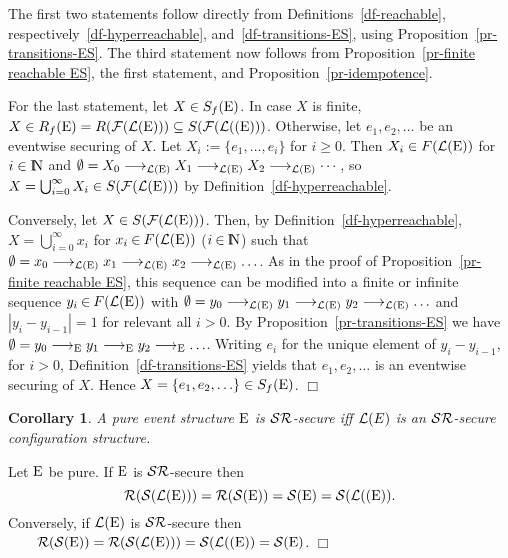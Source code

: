 \documentclass[twocolumn]{article}
\newtheorem{coro}{Corollary}
\newenvironment{corollary}[1]{\begin{coro} \rm \label{cor-#1} }{\end{coro}}
\newenvironment{proof}{\begin{trivlist} \item[\hspace{\labelsep}\bf
Proof:]}{\hfill $\Box$\end{trivlist}}
\newcommand{\df}[1]{Definition~\ref{df-#1}}
\newcommand{\pr}[1]{Proposition~\ref{pr-#1}}
\newcommand{\dl}[1]{\mbox{\rm I\hspace{-0.75mm}#1}}     \newcommand{\dc}[1]{\mbox{\rm {\raisebox{.4ex}{\makebox [0pt][l]{\hspace{.2em}\scriptsize $\mid$}}}#1}}
\newcommand{\IN}{\dl{N}}                        \newcommand{\IQ}{\dc{Q}}                        \newcommand{\IC}{\dc{C}}                        \newcommand{\IE}{\dl{E}}                        \newcommand{\IG}{\dc{G}}                        \newcommand{\fC}{{\cal C}}                      \newcommand{\fE}{{\cal E}}                      \newcommand{\fG}{{\cal G}}                      \newcommand{\fN}{{\cal N}}                      \newcommand{\fF}{{\cal F}}                      \newcommand{\fL}{{\cal L}}                      \newcommand{\fM}{{\cal M}}                      \newcommand{\fS}{{\cal S}}                      \newcommand{\fR}{{\cal R}}                      \newcommand{\eC}{{\rm C}}                       \newcommand{\eD}{{\rm D}}                       \newcommand{\eE}{{\rm E}}                       \newcommand{\eF}{{\rm F}}                       \newcommand{\eG}{{\rm G}}                       \newcommand{\eH}{{\rm H}}                       \newcommand{\eK}{{\rm K}}                       \newcommand{\eL}{{\rm L}}                       \newcommand{\eN}{{\rm N}}                       \newcommand{\eP}{{\rm P}}                       \newcommand{\eM}{{\rm M}}                       \newcommand{\eT}{{\rm T}}                       \newcommand{\fT}{{\cal T}}
\begin{document}
\begin{proof}
The first two statements follow directly from
Definitions~\ref{df-reachable}, respectively~\ref{df-hyperreachable},
and~\ref{df-transitions-ES}, using \pr{transitions-ES}. The third
statement now follows from \pr{finite reachable ES}, the first
statement, and \pr{idempotence}.

For the last statement, let $X\in S_f(\eE)$. In case $X$ is finite, $X
\in R_f(\eE) = R(\fF(\fL(\eE))) \subseteq S(\fF(\fL((\eE)))$. Otherwise,
let $e_1,e_2,\ldots$ be an eventwise securing of $X$. Let $X_i \mathbin{:=}
\{e_1,\ldots,e_i\}$ for $i\mathbin\geq 0$.  Then $X_i \in F(\fL(\eE))$
for $i\in\IN$ and $\emptyset =X_0 \goto{}_{\fL(\eE)} X_1
\goto{}_{\fL(\eE)} X_2 \goto{}_{\fL(\eE)} \cdots$, so
$X = \bigcup_{i=0}^\infty X_i \in S(\fF(\fL(\eE)))$ by \df{hyperreachable}.

Conversely, let $X\in S(\fF(\fL(\eE)))$. Then, by \df{hyperreachable},
$X=\bigcup_{i=0}^\infty x_i$ for $x_i \mathbin\in F(\fL(\eE))$
($i\mathbin\in\IN$) such that $\emptyset = x_0 \goto{}_{\fL(\eE)} x_1
\goto{}_{\fL(\eE)} x_2 \goto{}_{\fL(\eE)} \ldots$.
As in the proof of \pr{finite reachable ES}, this sequence can be
modified into a finite or infinite sequence $y_i \mathbin\in
F(\fL(\eE))$ with $\emptyset = y_0
\goto{}_{\fL(\eE)} y_1 \goto{}_{\fL(\eE)} y_2 \goto{}_{\fL(\eE)} \ldots$
and $|y_i - y_{i-1}|=1$ for relevant all $i>0$. By \pr{transitions-ES} we have
$\emptyset = y_0 \goto{}_\eE y_1 \goto{}_\eE y_2 \goto{}_\eE \ldots$.
Writing $e_i$ for the unique element of $y_i-y_{i-1}$, for $i>0$,
\df{transitions-ES} yields that $e_1,e_2,\ldots$ is an eventwise
securing of $X$. Hence $X=\{e_1,e_2,\ldots\} \in S_f(\eE)$.
\end{proof}

\begin{corollary}{secure}
A pure event structure $\eE$ is $\fS\fR$-secure iff $\fL(E)$
is an $\fS\fR$-secure configuration structure.
\end{corollary}

\begin{proof}
Let $\eE$ be pure.  If $\eE$ is $\fS\fR$-secure then
\vspace{-1.5ex}
$$\fR(\fS(\fL(\eE)))=\fR(\fS(\eE))=\fS(\eE)=\fS(\fL((\eE)).
\vspace{-1.5ex}$$
Conversely, if $\fL(\eE)$ is $\fS\fR$-secure then\\[1ex]
\mbox{~~~~}\hfill$\fR(\fS(\eE))=\fR(\fS(\fL(\eE)))=\fS(\fL((\eE))=\fS(\eE)$.
\end{proof}
\end{document}
